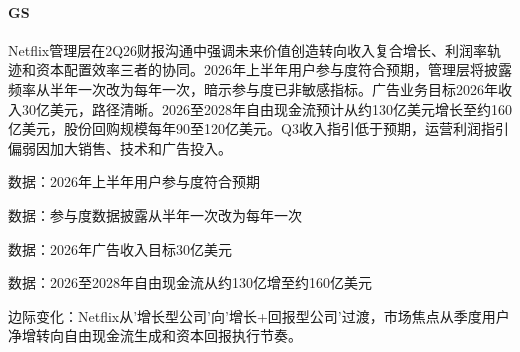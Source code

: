 \documentclass[11pt]{ctexart}
\begin{document}
\paragraph{GS} Netflix管理层在2Q26财报沟通中强调未来价值创造转向收入复合增长、利润率轨迹和资本配置效率三者的协同。2026年上半年用户参与度符合预期，管理层将披露频率从半年一次改为每年一次，暗示参与度已非敏感指标。广告业务目标2026年收入30亿美元，路径清晰。2026至2028年自由现金流预计从约130亿美元增长至约160亿美元，股份回购规模每年90至120亿美元。Q3收入指引低于预期，运营利润指引偏弱因加大销售、技术和广告投入。
{\small\color{refgray}数据：2026年上半年用户参与度符合预期\par}
{\small\color{refgray}数据：参与度数据披露从半年一次改为每年一次\par}
{\small\color{refgray}数据：2026年广告收入目标30亿美元\par}
{\small\color{refgray}数据：2026至2028年自由现金流从约130亿增至约160亿美元\par}
{\small\color{refgray}边际变化：Netflix从'增长型公司'向'增长+回报型公司'过渡，市场焦点从季度用户净增转向自由现金流生成和资本回报执行节奏。\par}
\end{document}
